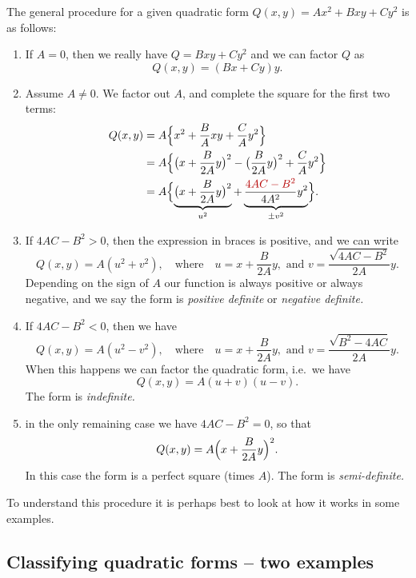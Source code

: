 The general procedure for a given quadratic form $Q(x, y) = Ax^2+Bxy+Cy^2$ is as
follows:
\begin{enumerate}
\item If $A=0$, then we really have $Q = Bxy+Cy^2$ and we can factor $Q$ as
  \[
    Q(x, y) = (Bx+Cy)y.
  \]
\item Assume $A\ne 0$.
  We factor out $A$, and complete the square for the
  first two terms:
\begin{align*}
    Q(x, y) &= A\Bigl\{x^2+\frac{ B}{A}xy + \frac CA y^2\Bigr\}\\
    &=A \Bigl\{\bigl(x+\frac{B}{2A}y\bigr)^2 - \bigl(\frac{B}{2A}y\bigr)^2 + 
    \frac CA y^2\Bigr\}\\
    &=A \Bigl\{
    \underbrace{
      \bigl(x+\frac{B}{2A}y\bigr)^2
    }_{u^2}
    + \underbrace{
      \frac{\color{badgerred}4AC-B^2}{4A^2}y^2
    }_{\pm v^2}
    \Bigr\}.
\end{align*}
\item If $4AC-B^2>0$, then the expression in braces is positive, and we can
  write 
  \[
    Q(x, y) = A(u^2+v^2), \quad\text{where}\quad
    u = x+\frac{B}{2A}y, \text{ and }
    v = \frac{\sqrt{4AC-B^2}}{2A}y.
  \]
  Depending on the sign of $A$ our function is always positive or always
  negative, and we say the form is \emph{positive definite} or \emph{negative
  definite.}
\item If $4AC-B^2<0$, then we have
  \[
    Q(x, y) = A(u^2-v^2), \quad\text{where}\quad
    u = x+\frac{B}{2A}y, \text{ and }
    v = \frac{\sqrt{B^2-4AC}}{2A}y.
  \]
  When this happens we can factor the quadratic form, i.e.~we have
  \[
    Q(x, y) = A (u+v)(u-v).
  \]
  The form is \emph{indefinite.}
\item in the only remaining case we have $4AC-B^2=0$, so that
  \[
    Q(x, y) = A\Bigl(x+\frac{B}{2A}y\Bigr)^2.
  \]
  In this case the form is a perfect square (times $A$).
  The form is \emph{semi-definite.}

\end{enumerate}
To understand this procedure it is perhaps best to look at how it works in some
examples.

\subsection{Classifying quadratic forms -- two examples} 


